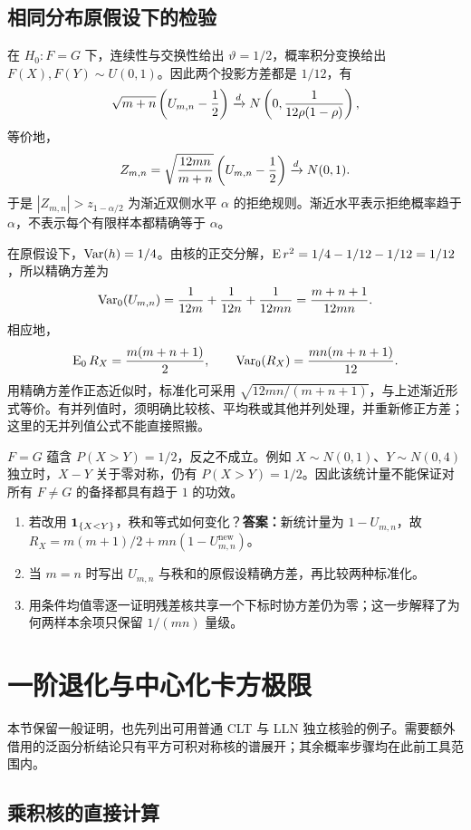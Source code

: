 \subsection{相同分布原假设下的检验}

在 $H_0:F=G$ 下，连续性与交换性给出 $\vartheta=1/2$，概率积分变换给出 $F(X),F(Y)\sim U(0,1)$。因此两个投影方差都是 $1/12$，有
\[
 \sqrt{m+n}\left(U_{m,n}-\frac12\right)
 \xrightarrow{d} N\left(0,\frac1{12\rho(1-\rho)}\right),
\]
等价地，
\[
 Z_{m,n}=\sqrt{\frac{12mn}{m+n}}
 \left(U_{m,n}-\frac12\right)\xrightarrow{d} N(0,1).
\]
于是 $|Z_{m,n}|>z_{1-\alpha/2}$ 为渐近双侧水平 $\alpha$ 的拒绝规则。渐近水平表示拒绝概率趋于 $\alpha$，不表示每个有限样本都精确等于 $\alpha$。

在原假设下，$\operatorname{Var}(h)=1/4$。由核的正交分解，$\operatorname{E} r^2=1/4-1/12-1/12=1/12$，所以精确方差为
\[
 \operatorname{Var}_0(U_{m,n})=\frac1{12m}+\frac1{12n}+\frac1{12mn}
 =\frac{m+n+1}{12mn}.
\]
相应地，
\[
 \operatorname{E}_0R_X=\frac{m(m+n+1)}2,\qquad
 \operatorname{Var}_0(R_X)=\frac{mn(m+n+1)}{12}.
\]
用精确方差作正态近似时，标准化可采用 $\sqrt{12mn/(m+n+1)}$，与上述渐近形式等价。有并列值时，须明确比较核、平均秩或其他并列处理，并重新修正方差；这里的无并列值公式不能直接照搬。

\begin{notebox}[检验目标与练习]
$F=G$ 蕴含 $P(X>Y)=1/2$，反之不成立。例如 $X\sim N(0,1)$、$Y\sim N(0,4)$ 独立时，$X-Y$ 关于零对称，仍有 $P(X>Y)=1/2$。因此该统计量不能保证对所有 $F\neq G$ 的备择都具有趋于 $1$ 的功效。
\begin{enumerate}
 \item 若改用 $\mathbf 1_{\{X<Y\}}$，秩和等式如何变化？\textbf{答案：}新统计量为 $1-U_{m,n}$，故 $R_X=m(m+1)/2+mn(1-U_{m,n}^{\mathrm{new}})$。
 \item 当 $m=n$ 时写出 $U_{m,n}$ 与秩和的原假设精确方差，再比较两种标准化。
 \item 用条件均值零逐一证明残差核共享一个下标时协方差仍为零；这一步解释了为何两样本余项只保留 $1/(mn)$ 量级。
\end{enumerate}
\end{notebox}

\section{一阶退化与中心化卡方极限}

本节保留一般证明，也先列出可用普通 CLT 与 LLN 独立核验的例子。需要额外借用的泛函分析结论只有平方可积对称核的谱展开；其余概率步骤均在此前工具范围内。

\subsection{乘积核的直接计算}

